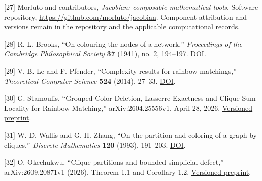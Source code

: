 \documentclass[spanish,11pt,a4paper]{article}
\begin{document}
{[}27{]} Morluto and contributors, \emph{Jacobian: composable
mathematical tools}. Software repository,
\url{https://github.com/morluto/jacobian}. Component attribution and
versions remain in the repository and the applicable computational
records.

{[}28{]} R. L. Brooks, ``On colouring the nodes of a network,''
\emph{Proceedings of the Cambridge Philosophical Society} \textbf{37}
(1941), no. 2, 194--197.
\href{https://doi.org/10.1017/S030500410002168X}{DOI}.

{[}29{]} V. B. Le and F. Pfender, ``Complexity results for rainbow
matchings,'' \emph{Theoretical Computer Science} \textbf{524} (2014),
27--33. \href{https://doi.org/10.1016/j.tcs.2013.12.013}{DOI}.

{[}30{]} G. Stamoulis, ``Grouped Color Deletion, Lasserre Exactness and
Clique-Sum Locality for Rainbow Matching,'' arXiv:2604.25556v1, April
28, 2026. \href{https://arxiv.org/abs/2604.25556v1}{Versioned preprint}.

{[}31{]} W. D. Wallis and G.-H. Zhang, ``On the partition and coloring
of a graph by cliques,'' \emph{Discrete Mathematics} \textbf{120}
(1993), 191--203.
\href{https://doi.org/10.1016/0012-365X(93)90576-F}{DOI}.

{[}32{]} O. Okechukwu, ``Clique partitions and bounded simplicial
defect,'' arXiv:2609.20871v1 (2026), Theorem 1.1 and Corollary 1.2.
\href{https://arxiv.org/abs/2609.20871v1}{Versioned preprint}.

\endgroup
\end{document}

